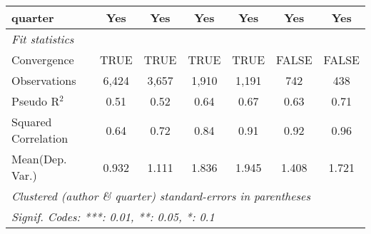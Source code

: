 \begin{tabular}{lcccccc}
   quarter                                                    & Yes          & Yes           & Yes           & Yes           & Yes          & Yes\\  
   \midrule
   \emph{Fit statistics}\\
   Convergence                                                &TRUE          & TRUE          & TRUE          & TRUE          & FALSE        & FALSE\\  
   Observations                                               & 6,424        & 3,657         & 1,910         & 1,191         & 742          & 438\\  
   Pseudo R$^2$                                               & 0.51         & 0.52          & 0.64          & 0.67          & 0.63         & 0.71\\  
   Squared Correlation                                        & 0.64         & 0.72          & 0.84          & 0.91          & 0.92         & 0.96\\  
Mean(Dep. Var.) & 0.932 & 1.111 & 1.836 & 1.945 & 1.408 & 1.721 \\
   \midrule \midrule
   \multicolumn{7}{l}{\emph{Clustered (author \& quarter) standard-errors in parentheses}}\\
   \multicolumn{7}{l}{\emph{Signif. Codes: ***: 0.01, **: 0.05, *: 0.1}}\\
\end{tabular}
\par\endgroup
